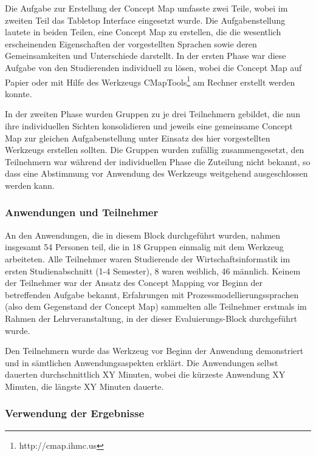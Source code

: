 Die Aufgabe zur Erstellung der Concept Map umfasste zwei Teile, wobei im zweiten Teil das Tabletop Interface eingesetzt wurde. Die Aufgabenstellung lautete in beiden Teilen, eine Concept Map zu erstellen, die die wesentlich erscheinenden Eigenschaften der vorgestellten Sprachen sowie deren Gemeinsamkeiten und Unterschiede darstellt. In der ersten Phase war diese Aufgabe von den Studierenden individuell zu lösen, wobei die Concept Map auf Papier oder mit Hilfe des Werkzeugs CMapTools\footnote{http://cmap.ihmc.us} \citep{Canas04} am Rechner erstellt werden konnte. 

In der zweiten Phase wurden Gruppen zu je drei Teilnehmern gebildet, die nun ihre individuellen Sichten konsolidieren und jeweils eine gemeinsame Concept Map zur gleichen Aufgabenstellung unter Einsatz des hier vorgestellten Werkzeugs erstellen sollten. Die Gruppen wurden zufällig zusammengesetzt, den Teilnehmern war während der individuellen Phase die Zuteilung nicht bekannt, so dass eine Abstimmung vor Anwendung des Werkzeugs weitgehend ausgeschlossen werden kann.


\subsubsection{Anwendungen und Teilnehmer} %
\label{ssub:3_teilnehmer}

An den Anwendungen, die in diesem Block durchgeführt wurden, nahmen insgesamt 54 Personen teil, die in 18 Gruppen einmalig mit dem Werkzeug arbeiteten. Alle Teilnehmer waren Studierende der Wirtschaftsinformatik im ersten Studienabschnitt (1-4 Semester), 8 waren weiblich, 46 männlich. Keinem der Teilnehmer war der Ansatz des Concept Mapping vor Beginn der betreffenden Aufgabe bekannt, Erfahrungen mit Prozessmodellierungssprachen (also dem Gegenstand der Concept Map) sammelten alle Teilnehmer erstmals im Rahmen der Lehrveranstaltung, in der dieser Evaluierungs-Block durchgeführt wurde.

Den Teilnehmern wurde das Werkzeug vor Beginn der Anwendung demonstriert und in sämtlichen Anwendungsaspekten erklärt. Die Anwendungen selbst dauerten durchschnittlich XY Minuten, wobei die kürzeste Anwendung XY Minuten, die längste XY Minuten dauerte.

\subsubsection{Verwendung der Ergebnisse} %
\label{ssub:3_verwendung_der_ergebnisse}

